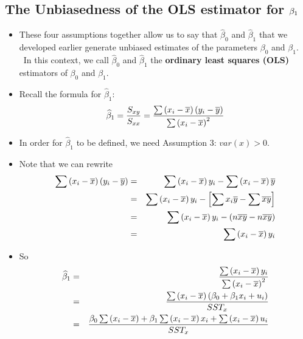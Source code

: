 \documentclass[11pt]{article}
\begin{document}
\subsection{The Unbiasedness of the OLS estimator for $\protect\beta _{1}$}

\begin{itemize}
\item These four assumptions together allow us to say that $\widehat{\beta }%
_{0}$ and $\widehat{\beta }_{1}$ that we developed earlier generate unbiased
estimates of the parameters $\beta _{0}$ and $\beta _{1}.$ \ In this
context, we call $\widehat{\beta }_{0}$ and $\widehat{\beta }_{1}$ the 
\textbf{ordinary least squares (OLS) }estimators of $\beta _{0}$ and $\beta
_{1}.$

\item Recall the formula for $\widehat{\beta }_{1}:$ 
\begin{equation*}
\widehat{\beta }_{1}=\frac{S_{xy}}{S_{xx}}=\frac{\sum \left( x_{i}-\overline{%
x}\right) \left( y_{i}-\overline{y}\right) }{\sum \left( x_{i}-\overline{x}%
\right) ^{2}}
\end{equation*}

\item In order for $\widehat{\beta }_{1}$ to be defined, we need Assumption
3: $var\left( x\right) >0.$

\item Note that we can rewrite%
\begin{eqnarray*}
\sum \left( x_{i}-\overline{x}\right) \left( y_{i}-\overline{y}\right)
&=&\sum \left( x_{i}-\overline{x}\right) y_{i}-\sum \left( x_{i}-\overline{x}%
\right) \overline{y} \\
&=&\sum \left( x_{i}-\overline{x}\right) y_{i}-\left[ \sum x_{i}\overline{y}%
-\sum \overline{x}\overline{y}\right] \\
&=&\sum \left( x_{i}-\overline{x}\right) y_{i}-\left( n\overline{x}\overline{%
y}-n\overline{x}\overline{y}\right) \\
&=&\sum \left( x_{i}-\overline{x}\right) y_{i}
\end{eqnarray*}

\item So%
\begin{eqnarray*}
\widehat{\beta }_{1} &=&\frac{\sum \left( x_{i}-\overline{x}\right) y_{i}}{%
\sum \left( x_{i}-\overline{x}\right) ^{2}} \\
&=&\frac{\sum \left( x_{i}-\overline{x}\right) \left( \beta _{0}+\beta
_{1}x_{i}+u_{i}\right) }{SST_{x}} \\
&=&\frac{\beta _{0}\sum \left( x_{i}-\overline{x}\right) +\beta _{1}\sum
\left( x_{i}-\overline{x}\right) x_{i}+\sum \left( x_{i}-\overline{x}\right)
u_{i}}{SST_{x}}
\end{eqnarray*}


\end{itemize}
\end{document}
